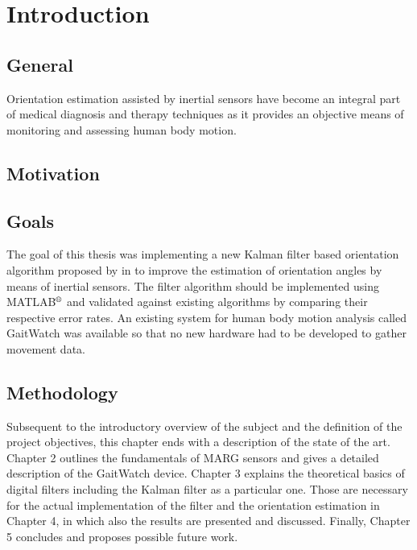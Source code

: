 \chapter{Introduction}
\label{ch:Introduction}

\section{General}

Orientation estimation assisted by inertial sensors have become an integral part of medical diagnosis and therapy techniques as it provides an objective means of monitoring and assessing human body motion.

\section{Motivation}


\section{Goals}

The goal of this thesis was implementing a new Kalman filter based orientation algorithm proposed by \citeauthor{bennett_motion_2014} in \cite{bennett_motion_2014} to improve the estimation of orientation angles by means of inertial sensors. The filter algorithm should be implemented using MATLAB$\textsuperscript{\textregistered}$ and validated against existing algorithms by comparing their respective error rates. An existing system for human body motion analysis called GaitWatch was available so that no new hardware had to be developed to gather movement data.

\section{Methodology}

Subsequent to the introductory overview of the subject and the definition of the project objectives, this chapter ends with a description of the state of the art. Chapter 2 outlines the fundamentals of MARG sensors and gives a detailed description of the GaitWatch device. Chapter 3 explains the theoretical basics of digital filters including the Kalman filter as a particular one. Those are necessary for the actual implementation of the filter and the orientation estimation in Chapter 4, in which also the results are presented and discussed. Finally, Chapter 5 concludes and proposes possible future work.

